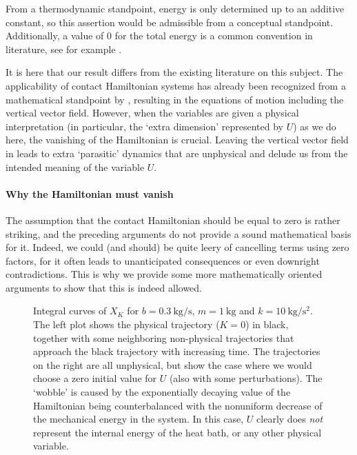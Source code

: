 From a thermodynamic standpoint, energy is only determined up to an additive constant, so this assertion would be admissible from a conceptual standpoint. Additionally, a value of 0 for the total energy is a common convention in literature, see for example \citet{Fermi1936}.

It is here that our result differs from the existing literature on this subject. The applicability of contact Hamiltonian systems has already been recognized from a mathematical standpoint by \citet{Bravetti2017}, resulting in the equations of motion including the vertical vector field. However, when the variables are given a physical interpretation (in particular, the `extra dimension' represented by \(U\)) as we do here, the vanishing of the Hamiltonian is crucial.
Leaving the vertical vector field in leads to extra `parasitic' dynamics that are unphysical and delude us from the intended meaning of the variable \(U\).

\paragraph{Why the Hamiltonian must vanish} The assumption that the contact Hamiltonian should be equal to zero is rather striking, and the preceding arguments do not provide a sound mathematical basis for it. Indeed, we could (and should) be quite leery of cancelling terms using zero factors, for it often leads to unanticipated consequences or even downright contradictions. This is why we provide some more mathematically oriented arguments to show that this is indeed allowed.

\begin{figure}[ht!]
    \centering
    
    \caption{Integral curves of \(X_K\) for \(b = \SI{0.3}{\kilogram \per \second}\), \( m = \SI{1}{\kilogram}\) and  \(k = \SI{10}{\kilogram \per \second \squared}\). The left plot shows the physical trajectory (\(K = 0\)) in black, together with some neighboring non-physical trajectories that approach the black trajectory with increasing time. The trajectories on the right are all unphysical, but show the case where we would choose a zero initial value for \(U\) (also with some perturbations). The `wobble' is caused by the exponentially decaying value of the Hamiltonian being counterbalanced with the nonuniform decrease of the mechanical energy in the system. In this case, \(U\) clearly does \emph{not} represent the internal energy of the heat bath, or any other physical variable.}
    \label{fig:dho_trajectories}
\end{figure}


